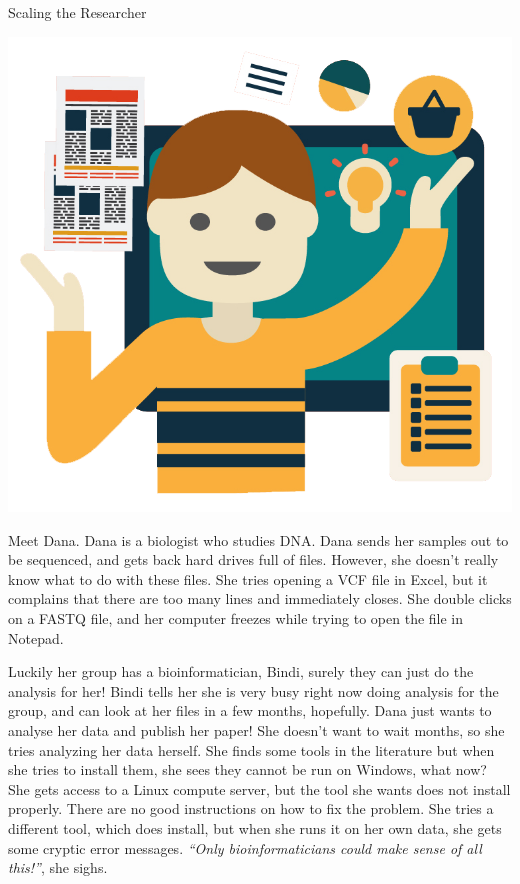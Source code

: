 \begin{center}
\vspace*{-1cm}
{\Large Scaling the Researcher \normalsize
\small

\vspace*{0.3cm}
\includegraphics[scale=0.1]{chapters/images/discussion/dana.png}
\vspace*{0.3cm}

Meet Dana.
Dana is a biologist who studies DNA\@.
Dana sends her samples out to be sequenced, and gets back hard drives full of files.
However, she doesn't really know what to do with these files.
She tries opening a VCF file in Excel, but it complains that there are too many lines and immediately closes.
She double clicks on a FASTQ file, and her computer freezes while trying to open the file in Notepad.

Luckily her group has a bioinformatician, Bindi, surely they can just do the analysis for her!
Bindi tells her she is very busy right now doing analysis for the group, and can look at her files in a few months, hopefully.
Dana just wants to analyse her data and publish her paper! She doesn't want to wait months, so she tries analyzing her data herself.
She finds some tools in the literature but when she tries to install them, she sees they cannot be run on Windows, what now?
She gets access to a Linux compute server, but the tool she wants does not install properly.
There are no good instructions on how to fix the problem.
She tries a different tool, which does install, but when she runs it on her own data, she gets some cryptic error messages.
\emph{``Only bioinformaticians could make sense of all this!''}, she sighs.

}
\end{center}

